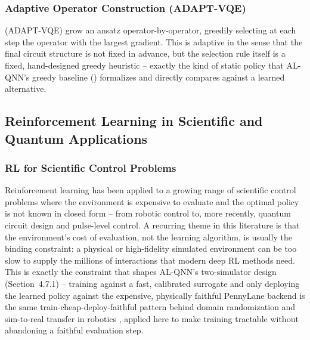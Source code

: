\subsubsection{Adaptive Operator Construction (ADAPT-VQE)}
\citet{grimsley2019adaptive} (ADAPT-VQE) grow an ansatz operator-by-operator, greedily selecting at each step the operator with the largest gradient. This is adaptive in the sense that the final circuit structure is not fixed in advance, but the selection rule itself is a fixed, hand-designed greedy heuristic -- exactly the kind of static policy that AL-QNN's greedy baseline () formalizes and directly compares against a learned alternative.

\subsection{Reinforcement Learning in Scientific and Quantum Applications}

\subsubsection{RL for Scientific Control Problems}
Reinforcement learning has been applied to a growing range of scientific control problems where the environment is expensive to evaluate and the optimal policy is not known in closed form -- from robotic control to, more recently, quantum circuit design and pulse-level control. A recurring theme in this literature is that the environment's cost of evaluation, not the learning algorithm, is usually the binding constraint: a physical or high-fidelity simulated environment can be too slow to supply the millions of interactions that modern deep RL methods need. This is exactly the constraint that shapes AL-QNN's two-simulator design (Section~4.7.1) -- training against a fast, calibrated surrogate and only deploying the learned policy against the expensive, physically faithful PennyLane backend is the same train-cheap-deploy-faithful pattern behind domain randomization and sim-to-real transfer in robotics \citep{tobin2017domain}, applied here to make training tractable without abandoning a faithful evaluation step.

